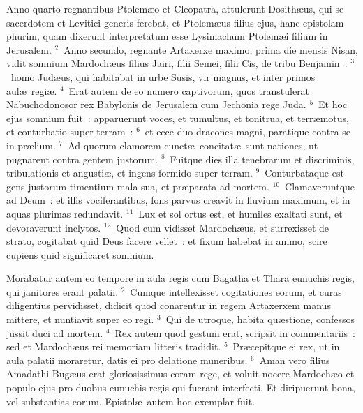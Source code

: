 \lettrine[lines=3,image=true,loversize=0.05,lraise=-0.03]{A}{}nno quarto regnantibus Ptolem\ae o et Cleopatra, attulerunt Dosith\ae us, qui se sacerdotem et Levitici generis ferebat, et Ptolem\ae us filius ejus, hanc epistolam phurim, quam dixerunt interpretatum esse Lysimachum Ptolem\ae i filium in Jerusalem.
${}^{2}$~Anno secundo, regnante Artaxerxe maximo, prima die mensis Nisan, vidit somnium Mardoch\ae us filius Jairi, filii Semei, filii Cis, de tribu Benjamin~:
${}^{3}$~homo Jud\ae us, qui habitabat in urbe Susis, vir magnus, et inter primos aul\ae\ regi\ae .
${}^{4}$~Erat autem de eo numero captivorum, quos transtulerat Nabuchodonosor rex Babylonis de Jerusalem cum Jechonia rege Juda.
${}^{5}$~Et hoc ejus somnium fuit~: apparuerunt voces, et tumultus, et tonitrua, et terr\ae motus, et conturbatio super terram~:
${}^{6}$~et ecce duo dracones magni, paratique contra se in pr\ae lium.
${}^{7}$~Ad quorum clamorem cunct\ae\ concitat\ae\ sunt nationes, ut pugnarent contra gentem justorum.
${}^{8}$~Fuitque dies illa tenebrarum et discriminis, tribulationis et angusti\ae , et ingens formido super terram.
${}^{9}$~Conturbataque est gens justorum timentium mala sua, et pr\ae parata ad mortem.
${}^{10}$~Clamaveruntque ad Deum~: et illis vociferantibus, fons parvus creavit in fluvium maximum, et in aquas plurimas redundavit.
${}^{11}$~Lux et sol ortus est, et humiles exaltati sunt, et devoraverunt inclytos.
${}^{12}$~Quod cum vidisset Mardoch\ae us, et surrexisset de strato, cogitabat quid Deus facere vellet~: et fixum habebat in animo, scire cupiens quid significaret somnium.

\lettrine[lines=3,image=true,loversize=0.05,lraise=-0.03]{M}{}orabatur autem eo tempore in aula regis cum Bagatha et Thara eunuchis regis, qui janitores erant palatii.
${}^{2}$~Cumque intellexisset cogitationes eorum, et curas diligentius pervidisset, didicit quod conarentur in regem Artaxerxem manus mittere, et nuntiavit super eo regi.
${}^{3}$~Qui de utroque, habita qu\ae stione, confessos jussit duci ad mortem.
${}^{4}$~Rex autem quod gestum erat, scripsit in commentariis~: sed et Mardoch\ae us rei memoriam litteris tradidit.
${}^{5}$~Pr\ae cepitque ei rex, ut in aula palatii moraretur, datis ei pro delatione muneribus.
${}^{6}$~Aman vero filius Amadathi Bug\ae us erat gloriosissimus coram rege, et voluit nocere Mardoch\ae o et populo ejus pro duobus eunuchis regis qui fuerant interfecti. Et diripuerunt bona, vel substantias eorum. Epistol\ae\ autem hoc exemplar fuit.

